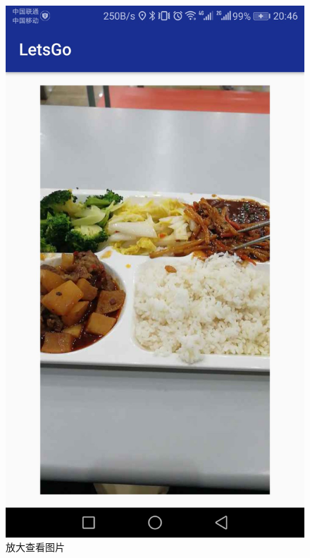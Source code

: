 \documentclass[UTF8]{article}
\begin{document}
\begin{figure}[H]
\begin{minipage}[t]{0.33\textwidth}
    \includegraphics[width=\textwidth]{images/demo_picture.jpeg}
    \caption{放大查看图片}
\end{minipage}
\begin{minipage}[t]{0.33\textwidth}

\end{minipage}
\end{figure}
\end{document}
